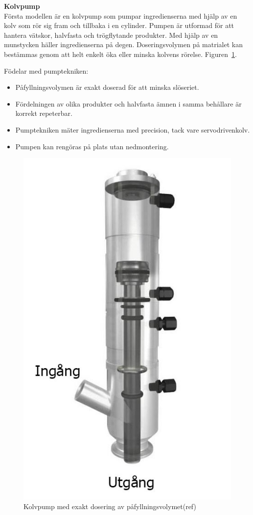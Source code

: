\textbf{Kolvpump}\\
Första modellen är en kolvpump som pumpar ingredienserna med hjälp av en kolv som rör sig fram och tillbaka i en cylinder. Pumpen är utformad för att hantera vätskor, halvfasta och trögflytande produkter. Med hjälp av en munstycken häller ingredienserna på degen. Doseringsvolymen på matrialet kan bestämmas genom att helt enkelt öka eller minska kolvens rörelse. Figuren~\ref{kolvpump}.

Födelar med pumptekniken:
\begin{itemize}
	\item Påfyllningsvolymen är exakt doserad för att minska slöseriet.
	\item Fördelningen av olika produkter och halvfasta ämnen i samma behållare är korrekt repeterbar.
	\item Pumptekniken mäter ingredienserna med precision, tack vare servodrivenkolv.
	\item Pumpen kan rengöras på plats utan nedmontering.
\end{itemize}

\begin{figure}[h]
	\begin{center}
		\includegraphics[scale=0.5]{images/maxresdefault.jpg}
		\caption{Kolvpump med exakt dosering av påfyllningsvolymet(ref)}
		\label{kolvpump}	
	\end{center}
\end{figure}


